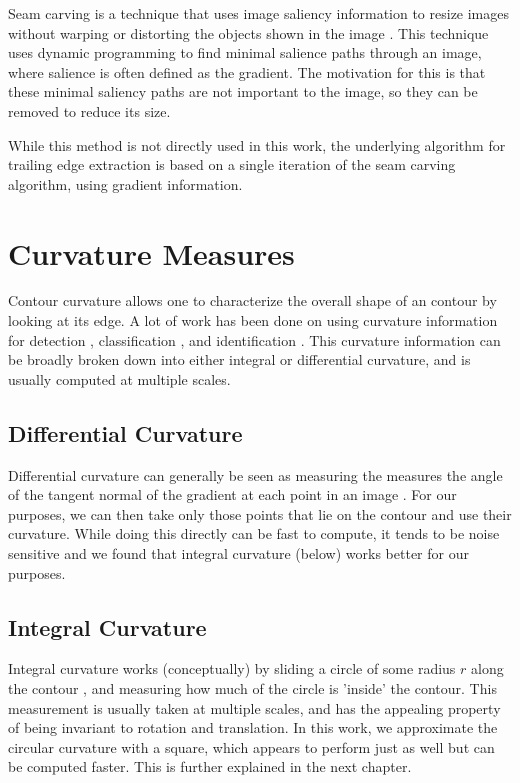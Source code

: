 Seam carving is a technique that uses image saliency information to resize images without warping or distorting the objects shown in the image \cite{Avidan:2007:SCC:1276377.1276390}.
This technique uses dynamic programming to find minimal salience paths through an image, where salience is often defined as the gradient.
The motivation for this is that these minimal saliency paths are not important to the image, so they can be removed to reduce its size.

While this method is not directly used in this work, the underlying algorithm for trailing edge extraction is based on a single iteration of the seam carving algorithm, using gradient information.

\section{Curvature Measures}

Contour curvature allows one to characterize the overall shape of an contour by looking at its edge.
A lot of work has been done on using curvature information for detection \cite{monroy2011beyond}, classification \cite{fischer2014image}, and identification \cite{kumar2012leafsnap}.
This curvature information can be broadly broken down into either integral or differential curvature, and is usually computed at multiple scales.

\subsection{Differential Curvature}

Differential curvature can generally be seen as measuring the measures the angle of the tangent normal of the gradient at each point in an image \cite{fischer2014image}.
For our purposes, we can then take only those points that lie on the contour and use their curvature.
While doing this directly can be fast to compute, it tends to be noise sensitive and we found that integral curvature (below) works better for our purposes.

\subsection{Integral Curvature}

Integral curvature works (conceptually) by sliding a circle of some radius $r$ along the contour \cite{pottmann2007integral}, and measuring how much of the circle is 'inside' the contour.
This measurement is usually taken at multiple scales, and has the appealing property of being invariant to rotation and translation.
In this work, we approximate the circular curvature with a square, which appears to perform just as well but can be computed faster.
This is further explained in the next chapter.

